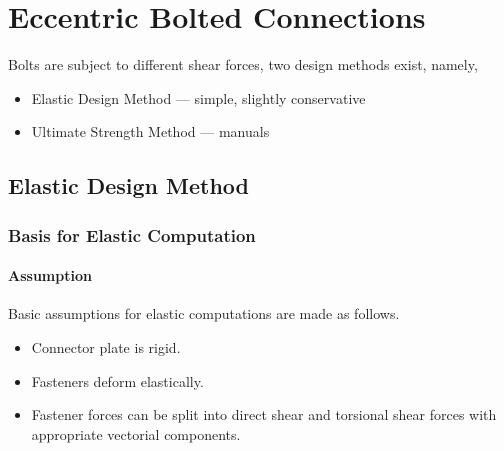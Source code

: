 \section{Eccentric Bolted Connections}
Bolts are subject to different shear forces, two design methods exist, namely,
\begin{itemize}
\item Elastic Design Method --- simple, slightly conservative
\item Ultimate Strength Method --- manuals
\end{itemize}
\subsection{Elastic Design Method}
\begin{figure}[H]
\centering
\end{figure}
\subsubsection{Basis for Elastic Computation}
\paragraph{Assumption}
Basic assumptions for elastic computations are made as follows.
\begin{itemize}
\item Connector plate is rigid.
\item Fasteners deform elastically.
\item Fastener forces can be split into direct shear and torsional shear forces with appropriate vectorial components.
\end{itemize}
